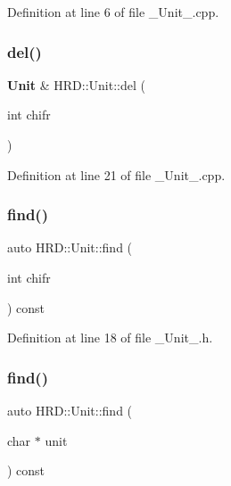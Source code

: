 Definition at line 6 of file \+\_\+\+Unit\+\_\+.\+cpp.

\mbox{\label{class_h_r_d_1_1_unit_a459dcefa63b6fe7086892e9831cc25fc}} 
\subsubsection{del()}
{\footnotesize\ttfamily \textbf{ Unit} \& H\+R\+D\+::\+Unit\+::del (\begin{DoxyParamCaption}\item[{int}]{chifr }\end{DoxyParamCaption})}



Definition at line 21 of file \+\_\+\+Unit\+\_\+.\+cpp.

\mbox{\label{class_h_r_d_1_1_unit_aa9e4bc8f93ec30cdee2266edaab22024}} 
\subsubsection{find()\hspace{0.1cm}{\footnotesize\ttfamily [1/2]}}
{\footnotesize\ttfamily auto H\+R\+D\+::\+Unit\+::find (\begin{DoxyParamCaption}\item[{int}]{chifr }\end{DoxyParamCaption}) const\hspace{0.3cm}{\ttfamily [inline]}}



Definition at line 18 of file \+\_\+\+Unit\+\_\+.\+h.

\mbox{\label{class_h_r_d_1_1_unit_a30bd9a6e7dcc61bb60a41080b61ca132}} 
\subsubsection{find()\hspace{0.1cm}{\footnotesize\ttfamily [2/2]}}
{\footnotesize\ttfamily auto H\+R\+D\+::\+Unit\+::find (\begin{DoxyParamCaption}\item[{char $\ast$}]{unit }\end{DoxyParamCaption}) const}



